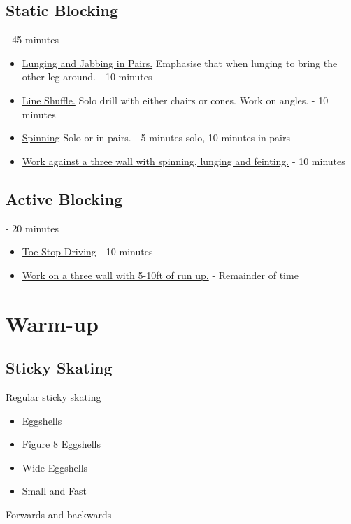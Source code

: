 \documentclass{journal}
\begin{document}
\subsection*{Static Blocking} - 45 minutes
\begin{itemize}
    \item \hyperref[drill:static_block:lunge]{Lunging and Jabbing in Pairs.} Emphasise that when lunging to bring the other leg around. - 10 minutes 
    \item \hyperref[drill:static_block:line_shuffle]{Line Shuffle.} Solo drill with either chairs or cones. Work on angles. - 10 minutes
    \item \hyperref[drill:static_block:spin_to_win]{Spinning} Solo or in pairs. - 5 minutes solo, 10 minutes in pairs 
    \item \hyperref[drill:static_block:spin_lunge_feint]{Work against a three wall with spinning, lunging and feinting.} - 10 minutes
\end{itemize}

\subsection*{Active Blocking} - 20 minutes
\begin{itemize}
\item \hyperref[drill:active_blocking:drives]{Toe Stop Driving} - 10 minutes 
\item \hyperref[drill:active_blocking:rolling in]{Work on a three wall with 5-10ft of run up.} - Remainder of time 
\end{itemize}

\pagebreak
\section*{Warm-up}
\label{sec:warmup}

\subsection*{Sticky Skating}
\label{drill:sticky:eggshells}

Regular sticky skating
\begin{itemize}
\item Eggshells 
\item Figure 8 Eggshells
\item Wide Eggshells
\item Small and Fast
\end{itemize}
Forwards and backwards
\end{document}
